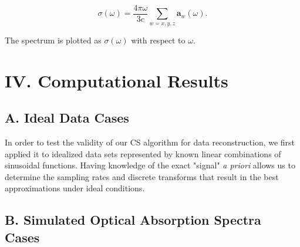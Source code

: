 \documentclass[11pt]{article}
\begin{document}
\begin{equation}\label{eq:cscross}
	\sigma(\omega) = \frac{4\pi\omega}{3c}\sum_{w = x,y,z}\mathbf{a}_{w}(\omega).
\end{equation}

The spectrum is plotted as $\sigma(\omega)$ with respect to $\omega$.


\section*{IV.	Computational Results} %


\subsection*{A.	Ideal Data Cases}
In order to test the validity of our CS algorithm for data reconstruction, we first applied it to idealized data sets represented by known linear combinations of sinusoidal functions. Having knowledge of the exact "signal" \emph{a priori} allows us to determine the sampling rates and discrete transforms that result in the best approximations under ideal conditions. 



\subsection*{B.	Simulated Optical Absorption Spectra Cases}




\end{document}
